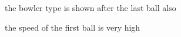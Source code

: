 
\begin{DoxyRefList}
\item[Class \mbox{\hyperlink{classplay_window}{play\+Window}} ]\label{bug__bug000001}%
%
the bowler type is shown after the last ball also 

the speed of the first ball is very high 
\end{DoxyRefList}